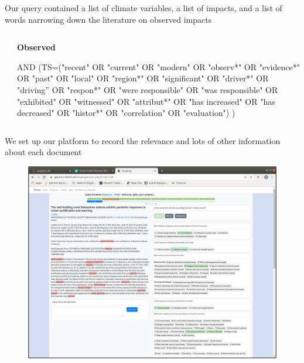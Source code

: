 \documentclass[9pt]{beamer}
\begin{document}
\begin{frame}{Our query contained a list of climate variables, a list of impacts, and a list of words narrowing down the literature on observed impacts}
\begin{columns}
\begin{column}{0.33\linewidth}
	\end{column}
	\begin{column}{0.33\linewidth}
		
		\textbf{Observed}
		
		\scriptsize
		
		AND (TS=("recent" OR "current" OR "modern" OR "observ*" OR "evidence*" OR "past" OR "local" OR "region*" OR "significant" OR "driver*" OR "driving” OR "respon*" OR "were responsible" OR "was responsible" OR "exhibited" OR "witnessed" OR "attribut*" OR "has increased" OR "has decreased" OR "histor*" OR "correlation" OR "evaluation") )
	\end{column}	
\end{columns}

\end{frame}

\begin{frame}{We set up our platform to record the relevance and lots of other information about each document}

\begin{figure}
	\includegraphics[width=\linewidth]{../plots/screening-platform}
\end{figure}

\end{frame}
\end{document}
